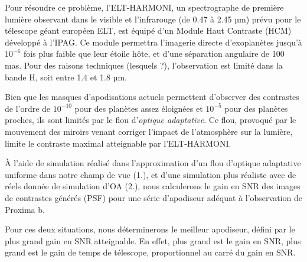 Pour résoudre ce problème, l'ELT-HARMONI, un spectrographe de première lumière observant dans le visible et l'infrarouge (de 0.47 à 2.45 µm) prévu pour le télescope géant européen ELT, est équipé d'un Module Haut Contraste (HCM) développé à l'IPAG. Ce module permettra l'imagerie directe d'exoplanètes jusqu'à $10^{-6}$ fois plus faible que leur étoile hôte, et d'une séparation angulaire de 100 mas. Pour des raisons techniques (lesquels ?), l'observation est limité dans la bande H, soit entre 1.4 et 1.8 µm.


Bien que les masques d'apodisations actuels permettent d'observer des contrastes de l'ordre de $10^{-10}$ pour des planètes assez éloignées et $10^{-5}$ pour des planètes proches, ils sont limités par le flou d'\textsl{optique adaptative}. Ce flou, provoqué par le mouvement des miroirs venant corriger l'impact de l'atmosphère sur la lumière, limite le contraste maximal atteignable par l'ELT-HARMONI.

À l’aide de simulation réalisé dans l’approximation d’un flou d’optique adaptative uniforme dans notre champ de vue (1.), et d’une simulation plus réaliste avec de réels donnée de simulation d’OA (2.), nous calculerons le gain en SNR des images de contrastes générés (PSF) pour une série d’apodiseur adéquat à l’observation de Proxima b.

Pour ces deux situations, nous déterminerons le meilleur apodiseur, défini par le plus grand gain en SNR atteignable. En effet, plus grand est le gain en SNR, plus grand est le gain de temps de télescope, proportionnel au carré du gain en SNR.





